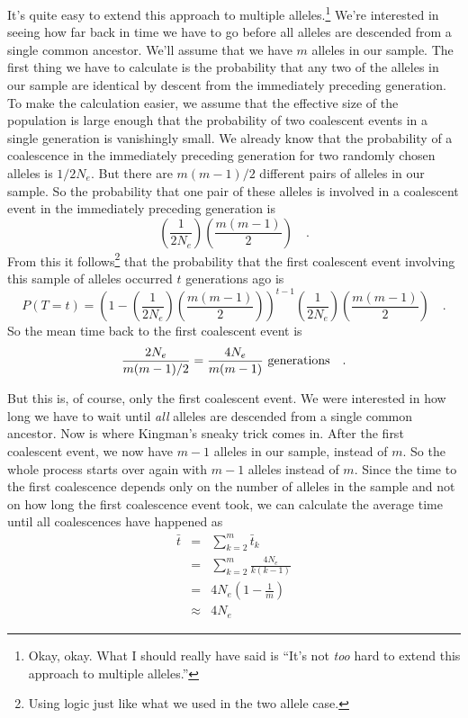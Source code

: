 It's quite easy to extend this approach to multiple
alleles.\footnote{Okay, okay. What I should really have said is ``It's
not {\it too\/} hard to extend this approach to multiple alleles.''}
We're interested in seeing how far back in time we have to go before
all alleles are descended from a single common ancestor. We'll assume
that we have $m$ alleles in our sample. The first thing we have to
calculate is the probability that any two of the alleles in our sample
are identical by descent from the immediately preceding generation. To
make the calculation easier, we assume that the effective size of the
population is large enough that the probability of two coalescent
events in a single generation is vanishingly small. We already know
that the probability of a coalescence in the immediately preceding
generation for two randomly chosen alleles is $1/2N_e$. But there are
$m(m-1)/2$ different pairs of alleles in our sample. So the
probability that one pair of these alleles is involved in a coalescent
event in the immediately preceding generation is
\[
\left(\frac{1}{2N_e}\right)\left(\frac{m(m-1)}{2}\right) \quad .
\]
From this it follows\footnote{Using logic just like what we used in
the two allele case.} that the probability that the first coalescent
event involving this sample of alleles occurred $t$ generations ago is
\begin{equation}
P(T=t) = 
\left(1-\left(\frac{1}{2N_e}\right)\left(\frac{m(m-1)}{2}\right)\right)^{t-1}
\left(\frac{1}{2N_e}\right)\left(\frac{m(m-1)}{2}\right)
\quad .
\label{eq:multi-allele}
\end{equation}
So the mean time back to the first coalescent event is
\[
\frac{2N_e}{m(m-1)/2} = \frac{4N_e}{m(m-1)} \hbox{ generations} \quad .
\]

But this is, of course, only the first coalescent event. We were
interested in how long we have to wait until {\it all\/} alleles are
descended from a single common ancestor. Now is where Kingman's sneaky
trick comes in. After the first coalescent event, we now have $m-1$
alleles in our sample, instead of $m$. So the whole process starts
over again with $m-1$ alleles instead of $m$. Since the time to the
first coalescence depends only on the number of alleles in the sample
and not on how long the first coalescence event took, we can calculate
the average time until all coalescences have happened
as
\begin{eqnarray*}
\bar t &=& \sum_{k=2}^m \bar t_k \\
       &=& \sum_{k=2}^m \frac{4N_e}{k(k-1)} \\
       &=& 4N_e\left(1 - \frac{1}{m}\right) \\
       &\approx& 4N_e
\end{eqnarray*}


